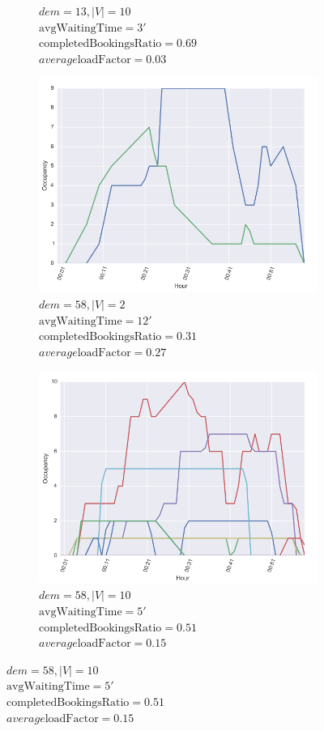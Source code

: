 \documentclass[12pt,a4paper]{article}
\begin{document}
\begin{figure}[]
\begin{subfigure}[b]{0.48\textwidth}
  \caption{$dem = 13, |V| = 10$\\ $\text{avgWaitingTime} = 3'$\\ $\text{completedBookingsRatio} = 0.69$ \\ $average\text{loadFactor} = 0.03$}
  \label{dem13v10}
\end{subfigure}
\begin{subfigure}[b]{0.48\textwidth}
  \includegraphics[width=\linewidth]{./images/dem582v}
  \caption{$dem = 58, |V| = 2$\\ $\text{avgWaitingTime} = 12'$\\ $\text{completedBookingsRatio} = 0.31$ \\ $average\text{loadFactor} = 0.27$}
  \label{dem58v2}
  \end{subfigure}
  \begin{subfigure}[b]{0.48\textwidth}
  \includegraphics[width=\linewidth]{./images/dem58v10}
  \caption{$dem = 58, |V| = 10$\\ $\text{avgWaitingTime} = 5'$\\ $\text{completedBookingsRatio} = 0.51$ \\ $average\text{loadFactor} = 0.15$}
  \label{dem58v10}
\end{subfigure}
\label{extremesimu}
\end{figure}
\end{document}
